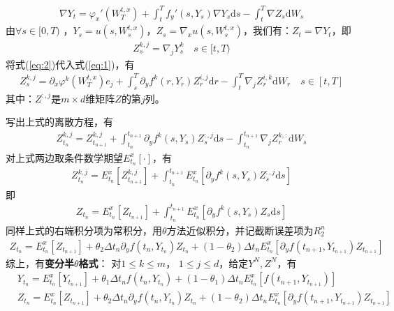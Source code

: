 			 \begin{align*}
			 \nabla {Y_t} = {\varphi _x '}\left( {W_T^{t,x}} \right) + \int_t^T {f_y '\left( {s,{Y_s}} \right)} \nabla {Y_s}\mathrm{d}s - \int_t^T {\nabla {Z_s}\mathrm{d}{W_s}} \end{align*}
			由$\forall s \in [0,T)$
			 ，${Y_s} = u\left( {s,W_s^{t,x}} \right)$，${Z_s} = {\nabla _x}u\left( {s,W_s^{t,x}} \right)$，我们有：${Z_t} = \nabla {Y_t}$，即
			\begin{align}\label{eq:2}
			Z_s^{k,j} = {\nabla _j}Y_s^k \quad s \in [t,T)
			\end{align}
			将式(\ref{eq:2})代入式(\ref{eq:1})，有
			\begin{align*}
			Z_s^{k,j} = {\partial _x}{\varphi ^k}( {W_T^{t,x}} ){e_j} + \int_s^T {{\partial _y}{f^k}( {r,{Y_r}} )} Z_r^{i,j}\mathrm{d}r - \int_t^T {{\nabla _j}Z_r^{i,k}\mathrm{d}{W_r}} \quad s \in [t,T]
			\end{align*}
			其中：$Z^{:,j}$是$m \times d$维矩阵$Z$的第$j$列。
			\par
			写出上式的离散方程，有
			\begin{align}\label{eq:3}
			Z_{{t_n}}^{k,j} = Z_{{t_{n + 1}}}^{k,j} + \int_{{t_n}}^{{t_{n + 1}}} {{\partial _y}{f^k}\left( {s,{Y_s}} \right)Z_s^{:,j}\mathrm{d}s}  - \int_{{t_n}}^{{t_{n + 1}}} {{\nabla _j}Z_r^{k,:}\mathrm{d}{W_s}}
			\end{align}
			对上式两边取条件数学期望$E_{{t_n}}^x[\cdot]$，有
			\begin{align*}
			Z_{{t_n}}^{k,j} = E_{{t_n}}^x\left[ {Z_{{t_{n + 1}}}^{k,j}} \right] + \int_{{t_n}}^{{t_{n + 1}}} {E_{{t_n}}^x\left[ {{\partial _y}{f^k}\left( {s,{Y_s}} \right)Z_s^{:,j}\mathrm{d}s} \right]}
			\end{align*}
			即\begin{align*}
			Z_{t_n} = E_{t_n}^x[Z_{t_{n + 1}}] + \int_{t_n}^{t_{n + 1}}E_{t_n}^x\left[{\partial _y}{f^k}(s,Y_s)Z_s\mathrm{d}s\right]
			\end{align*}
			同样上式的右端积分项为常积分，用$\theta$方法近似积分，并记截断误差项为$R_2^n$
			\begin{align*}
			Z_{t_n} = E_{t_n}^x[ Z_{t_{n + 1}} ] + \theta _2\Delta {t_n}{\partial _y}f( t_n,Y_{t_n} )Z_{t_n} + ( 1 - {\theta _2} )\Delta {t_n}E_{t_n}^x[ {\partial _y}f(t_{n + 1},Y_{t_{n + 1}})Z_{t_{n + 1}}]
			\end{align*}
			综上，有\textbf{变分半$\theta$格式}：
			对$1\leqslant k \leqslant m$， $1\leqslant j \leqslant d$，给定$Y^N,Z^N$，有
			\begin{align*}
			&Y_{t_n} = E_{t_n}^x[Y_{t_{n+1}}] + {\theta _1}\Delta {t_n}f(t_n,Y_{t_n})+(1-{\theta _1})\Delta {t_n}E_{t_n}^x[f(t_{n + 1},Y_{t_{n + 1}})] \\
			&Z_{t_n} = E_{t_n}^x[Z_{t_{n + 1}}] + {\theta _2}\Delta {t_n}{\partial _y}f(t_n,Y_{t_n})Z_{t_n} + (1-{\theta _2})\Delta {t_n}E_{t_n}^x[{\partial _y}f(t_{n + 1},Y_{t_{n + 1}})Z_{t_{n + 1}}]
			\end{align*}
